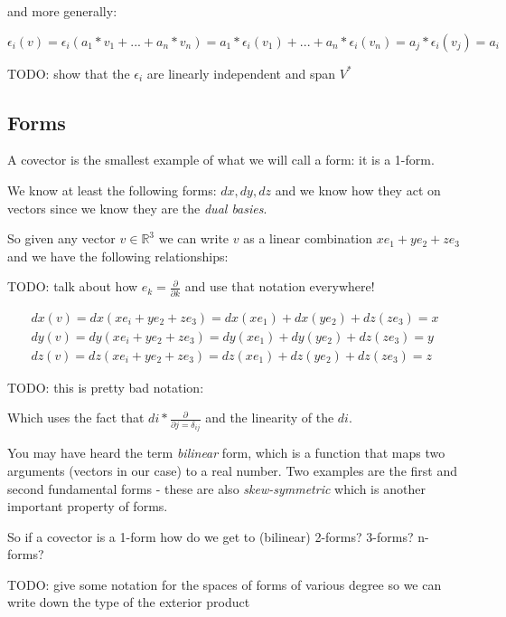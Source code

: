 \documentclass{article}
\begin{document}
and more generally:

\begin{equation*}
  \epsilon_{i}(v) = \epsilon_{i}(a_{1} * v_{1} + ... + a_{n} * v_{n}) = a_{1} * \epsilon_{i}(v_{1}) + ... + a_{n} * \epsilon_{i}(v_{n}) = a_{j} * \epsilon_{i}(v_{j}) = a_{i}
\end{equation*}

TODO: show that the $\epsilon_{i}$ are linearly independent and span $V^{*}$

\subsection{Forms}

A covector is the smallest example of what we will call a form: it is a 1-form.

We know at least the following forms: $dx, dy, dz$ and we know how they act on
vectors since we know they are the \textit{dual basies}.

So given any vector $v \in \mathbb{R}^{3}$ we can write $v$ as a linear
combination $xe_{1} + ye_{2} + ze_{3}$ and we have the following relationships:

TODO: talk about how $e_{k} = \frac{\partial}{\partial k}$ and use that notation everywhere!

\begin{align*}
  dx (v) = dx (xe_{i} + ye_{2} + ze_{3}) = dx (xe_{1}) + dx (ye_{2}) + dz (ze_{3}) = x \\
  dy (v) = dy (xe_{i} + ye_{2} + ze_{3}) = dy (xe_{1}) + dy (ye_{2}) + dz (ze_{3}) = y \\
  dz (v) = dz (xe_{i} + ye_{2} + ze_{3}) = dz (xe_{1}) + dz (ye_{2}) + dz (ze_{3}) = z
\end{align*}

TODO: this is pretty bad notation:

Which uses the fact that $di * \frac{\partial}{\partial j = \delta_{ij}}$ and
the linearity of the $di$.

You may have heard the term \textit{bilinear} form, which is a function that
maps two arguments (vectors in our case) to a real number. Two examples are the
first and second fundamental forms - these are also \textit{skew-symmetric}
which is another important property of forms.

So if a covector is a 1-form how do we get to (bilinear) 2-forms? 3-forms?
n-forms?

TODO: give some notation for the spaces of forms of various degree so we can
write down the type of the exterior product
\end{document}
